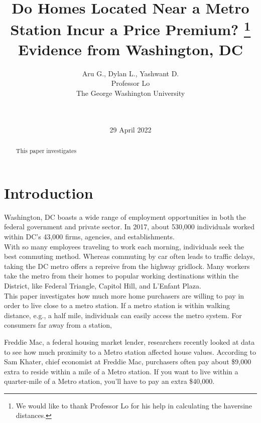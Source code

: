 \documentclass[12pt]{report}
\newcommand\tab[1][.50cm]{\hspace*{#1}}
\begin{document}
\title{%
Do Homes Located Near a Metro Station Incur a Price Premium? \thanks{{We would like to thank Professor Lo for his help in calculating the haversine distances.}} \\ 
\Large
Evidence from Washington, DC}
\author{Aru G., Dylan L., Yashwant D. \\ Professor Lo\\The George Washington University\\  \\  \\ }
\date{29 April 2022}

\maketitle





\begin{abstract}
\smallskip
This paper investigates 

\end{abstract}

\section*{Introduction}
Washington, DC boasts a wide range of employment opportunities in both the federal government and private sector. In 2017, about 530,000 individuals worked within DC's 43,000 firms, agencies, and establishments.\\
\tab With so many employees traveling to work each morning, individuals seek the best commuting method. Whereas commuting by car often leads to traffic delays, taking the DC metro offers a repreive from the highway gridlock. Many workers take the metro from their homes to popular working destinations within the District, like Federal Triangle, Capitol Hill, and L'Enfant Plaza.\\
\tab This paper investigates how much more home purchasers are willing to pay in order to live close to a metro station. If a metro station is within walking distance, e.g., a half mile, individuals can easily access the metro system. For consumers far away from a station, 


\tab Freddie Mac, a federal housing market lender,  researchers recently looked at data to see how much proximity to a Metro station affected house values. According to Sam Khater, chief economist at Freddie Mac, purchasers often pay about \$9,000 extra to reside within a mile of a Metro station. If you want to live within a quarter-mile of a Metro station, you'll have to pay an extra \$40,000.
\end{document}
